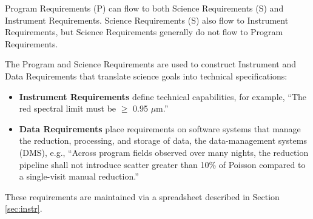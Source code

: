\documentclass[11pt,a4paper,twoside,onecolumn,openany,final,oldfontcommands]{memoir}
\begin{document}
\noindent Program Requirements (P) can flow to both Science Requirements (S) and Instrument Requirements.  Science Requirements (S) also flow to Instrument Requirements, but Science Requirements generally do not flow to Program Requirements.  

The Program and Science Requirements are used to construct Instrument and Data Requirements that translate science goals into technical specifications:


\begin{itemize}
\item \textbf{Instrument Requirements} define technical capabilities, for example, ``The red spectral limit must be $\geq$ 0.95 $\mu$m.'' 

\item \textbf{Data Requirements} place requirements on software systems that manage the reduction, processing, and storage of data, the data-management systems (DMS), e.g., ``Across program fields observed over many nights, the reduction pipeline shall not introduce scatter greater than 10\% of Poisson compared to a single-visit manual reduction.'' 
\end{itemize}

These requirements are maintained via a spreadsheet described in Section \ref{sec:instr}.


\end{document}
